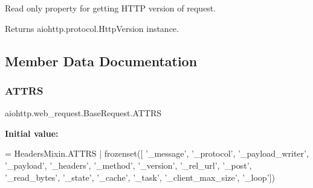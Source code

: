 \begin{DoxyVerb}Read only property for getting HTTP version of request.

Returns aiohttp.protocol.HttpVersion instance.
\end{DoxyVerb}
 

\subsection{Member Data Documentation}
\mbox{\label{classaiohttp_1_1web__request_1_1_base_request_a1ef7736fa77462cd1c115a013afe5cb8}} 
\subsubsection{\texorpdfstring{A\+T\+T\+RS}{ATTRS}}
{\footnotesize\ttfamily aiohttp.\+web\+\_\+request.\+Base\+Request.\+A\+T\+T\+RS\hspace{0.3cm}{\ttfamily [static]}}

{\bfseries Initial value\+:}
\begin{DoxyCode}
=  HeadersMixin.ATTRS | frozenset([
        \textcolor{stringliteral}{'\_message'}, \textcolor{stringliteral}{'\_protocol'}, \textcolor{stringliteral}{'\_payload\_writer'}, \textcolor{stringliteral}{'\_payload'}, \textcolor{stringliteral}{'\_headers'},
        \textcolor{stringliteral}{'\_method'}, \textcolor{stringliteral}{'\_version'}, \textcolor{stringliteral}{'\_rel\_url'}, \textcolor{stringliteral}{'\_post'}, \textcolor{stringliteral}{'\_read\_bytes'},
        \textcolor{stringliteral}{'\_state'}, \textcolor{stringliteral}{'\_cache'}, \textcolor{stringliteral}{'\_task'}, \textcolor{stringliteral}{'\_client\_max\_size'}, \textcolor{stringliteral}{'\_loop'}])
\end{DoxyCode}
\mbox{\label{classaiohttp_1_1web__request_1_1_base_request_ab1c8ad54e9a326ba7ee178a063ec13e1}} 

